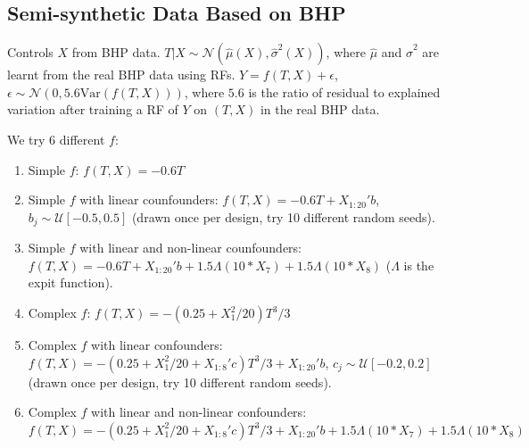 \documentclass[11pt]{article}
\begin{document}
\subsection{Semi-synthetic Data Based on BHP}
Controls $X$ from BHP data. 
$T | X \sim \mathcal{N}(\widehat{\mu}(X), \widehat{\sigma}^2(X))$, where $\widehat{\mu}$ and $\widehat{\sigma}^2$ are learnt from the real BHP data using RFs. $Y = f(T, X) + \epsilon$, $\epsilon \sim \mathcal{N}(0, 5.6 \mathrm{Var}(f(T,X)))$, where $5.6$ is the ratio of residual to explained variation after training a RF of $Y$ on $(T,X)$ in the real BHP data. 

We try 6 different $f$:
\begin{enumerate}
    \item Simple $f$: $f(T,X) = -0.6T$
    \item Simple $f$ with linear counfounders: $f(T,X) = -0.6T + X_{1:20}' b$, $b_j \sim \mathcal{U}[-0.5, 0.5]$ (drawn once per design, try 10 different random seeds).
    \item Simple $f$ with linear and non-linear counfounders:$f(T,X) = -0.6T + X_{1:20}' b + 1.5 \Lambda(10 * X_7) + 1.5\Lambda(10 * X_8)$ ($\Lambda$ is the expit function).
    \item Complex $f$: $f(T,X) = -(0.25 + X_1^2/20) T^3/3$
    \item Complex $f$ with linear confounders: $f(T,X) = -(0.25 + X_1^2/20 + X_{1:8}' c) T^3/3 + X_{1:20}' b$, $c_j \sim \mathcal{U}[-0.2, 0.2]$ (drawn once per design, try 10 different random seeds).
    \item Complex $f$ with linear and non-linear confounders: $f(T,X) = -(0.25 + X_1^2/20 + X_{1:8}' c) T^3/3 + X_{1:20}' b + 1.5 \Lambda(10 * X_7) + 1.5\Lambda(10 * X_8)$
\end{enumerate}
\end{document}
